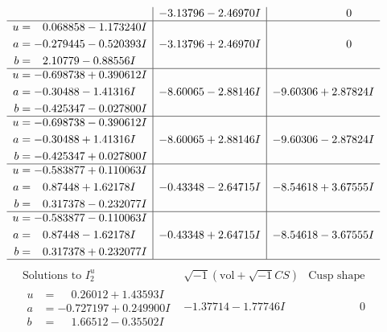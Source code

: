 \documentclass[1p]{elsarticle_modified}
\theoremstyle{definition}
\newcommand{\I}{\sqrt{-1}}
\begin{document}
$$\begin{array}{c|c|c}
 & -3.13796 - 2.46970 I & \phantom{-0.000000 } 0 \\ \hline\begin{aligned}
u &= \phantom{-}0.068858 - 1.173240 I \\
a &= -0.279445 - 0.520393 I \\
b &= \phantom{-}2.10779 - 0.88556 I\end{aligned}
 & -3.13796 + 2.46970 I & \phantom{-0.000000 } 0 \\ \hline\begin{aligned}
u &= -0.698738 + 0.390612 I \\
a &= -0.30488 - 1.41316 I \\
b &= -0.425347 - 0.027800 I\end{aligned}
 & -8.60065 - 2.88146 I & -9.60306 + 2.87824 I \\ \hline\begin{aligned}
u &= -0.698738 - 0.390612 I \\
a &= -0.30488 + 1.41316 I \\
b &= -0.425347 + 0.027800 I\end{aligned}
 & -8.60065 + 2.88146 I & -9.60306 - 2.87824 I \\ \hline\begin{aligned}
u &= -0.583877 + 0.110063 I \\
a &= \phantom{-}0.87448 + 1.62178 I \\
b &= \phantom{-}0.317378 - 0.232077 I\end{aligned}
 & -0.43348 - 2.64715 I & -8.54618 + 3.67555 I \\ \hline\begin{aligned}
u &= -0.583877 - 0.110063 I \\
a &= \phantom{-}0.87448 - 1.62178 I \\
b &= \phantom{-}0.317378 + 0.232077 I\end{aligned}
 & -0.43348 + 2.64715 I & -8.54618 - 3.67555 I\\
 \hline 
 \end{array}$$\newpage$$\begin{array}{c|c|c}  
\text{Solutions to }I^u_{2}& \I (\text{vol} + \sqrt{-1}CS) & \text{Cusp shape}\\
 \hline 
\begin{aligned}
u &= \phantom{-}0.26012 + 1.43593 I \\
a &= -0.727197 + 0.249900 I \\
b &= \phantom{-}1.66512 - 0.35502 I\end{aligned}
 & -1.37714 - 1.77746 I & \phantom{-0.000000 } 0 \\ \hline\begin{aligned}

\end{aligned}
\end{array}$$
\end{document}
